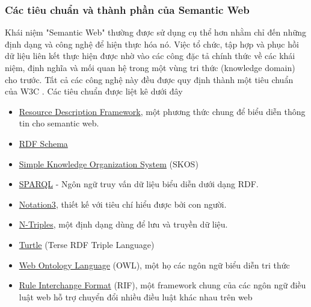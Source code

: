 \subsubsection{Các tiêu chuẩn và thành phần của Semantic Web}
Khái niệm "Semantic Web" thường được sử dụng cụ thể hơn nhằm chỉ đến những định dạng và công nghệ để hiện thực hóa nó. Việc tổ chức, tập hợp và phục hồi dữ liệu liên kết thực hiện được nhờ vào các công đặc tả chính thức về các khái niệm, định nghĩa và mối quan hệ trong một vùng tri thức (knowledge domain) cho trước. Tất cả các công nghệ này đều được quy định thành một tiêu chuẩn của W3C \cite{semantic2}. Các tiêu chuẩn được liệt kê dưới đây
\begin{itemize}
\item \href{http://en.wikipedia.org/wiki/Resource\_Description\_Framework}{Resource Description Framework}, một phương thức chung để biểu diễn thông tin cho semantic web.
\item \href{http://en.wikipedia.org/wiki/RDF_Schema}{RDF Schema}
\item \href{http://en.wikipedia.org/wiki/Simple_Knowledge_Organization_System}{Simple Knowledge Organization System} (SKOS)
\item \href{http://en.wikipedia.org/wiki/SPARQL}{SPARQL} - Ngôn ngữ truy vấn dữ liệu biểu diễn dưới dạng RDF.
\item \href{http://en.wikipedia.org/wiki/Notation3}{Notation3}, thiết kế với tiêu chí hiểu được bởi con người.
\item \href{http://en.wikipedia.org/wiki/N-Triples}{N-Triples}, một định dạng dùng để lưu và truyền dữ liệu.
\item \href{http://en.wikipedia.org/wiki/Turtle_(syntax)}{Turtle} (Terse RDF Triple Language)
\item \href{http://en.wikipedia.org/wiki/Web_Ontology_Language}{Web Ontology Language} (OWL), một họ các ngôn ngữ biểu diễn tri thức
\item \href{}{Rule Interchange Format} (RIF), một framework chung của các ngôn ngữ điều luật web hỗ trợ chuyển đổi nhiều điều luật khác nhau trên web
\end{itemize}
